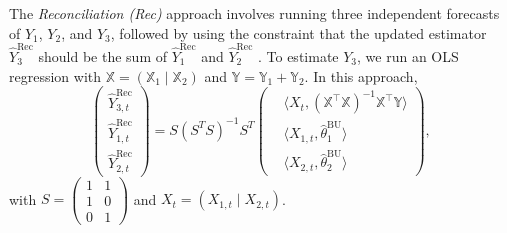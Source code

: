 The \textit{Reconciliation (Rec)} approach involves running three independent forecasts of $Y_1$, $Y_2$, and $Y_3$, followed by using the constraint that the updated estimator $\hat Y_3^{\mathrm{Rec}}$ should be the sum of $\hat Y_1^{\mathrm{Rec}}$ and $\hat Y_2^{\mathrm{Rec}}$ \citep{Wickramasuriya2019optimal}. To estimate $Y_3$, we run an OLS regression with 
$\mathbb X = (\mathbb X_1\mid  \mathbb X_2)$  and $\mathbb Y = \mathbb Y_1 +  \mathbb Y_2$. In this approach, 
\[
\begin{pmatrix}
    \hat Y_{3,t}^{\mathrm{Rec}}\\
    \hat Y_{1,t}^{\mathrm{Rec}}\\
    \hat Y_{2,t}^{\mathrm{Rec}}
\end{pmatrix} = S (S^T S)^{-1} S^T\begin{pmatrix}
    &\langle X_{t}, (\mathbb X^\top \mathbb X)^{-1}\mathbb X^\top \mathbb Y\rangle\\
    &\langle X_{1,t}, \hat \theta_1^{\mathrm{BU}}\rangle\\
    &\langle X_{2,t}, \hat \theta_2^{\mathrm{BU}}\rangle
\end{pmatrix},
\]
with $S = \begin{pmatrix}
    1 & 1 \\
    1 & 0 \\
    0 & 1
\end{pmatrix}$ and $X_t = (X_{1,t} \mid X_{2,t})$.

